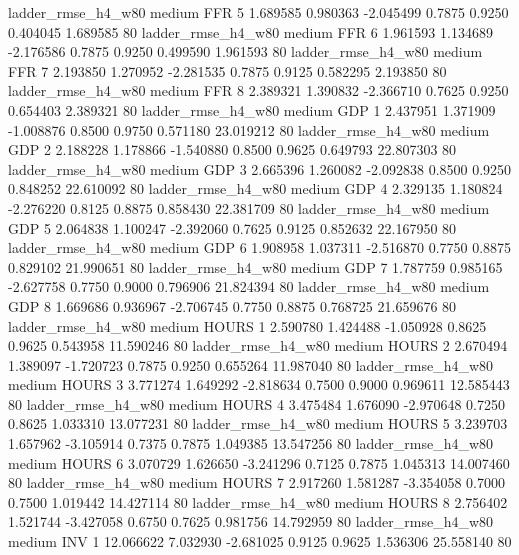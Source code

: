     ladder_rmse_h4_w80     medium      FFR                 5  1.689585 0.980363 -2.045499 0.7875 0.9250  0.404045    1.689585 80
    ladder_rmse_h4_w80     medium      FFR                 6  1.961593 1.134689 -2.176586 0.7875 0.9250  0.499590    1.961593 80
    ladder_rmse_h4_w80     medium      FFR                 7  2.193850 1.270952 -2.281535 0.7875 0.9125  0.582295    2.193850 80
    ladder_rmse_h4_w80     medium      FFR                 8  2.389321 1.390832 -2.366710 0.7625 0.9250  0.654403    2.389321 80
    ladder_rmse_h4_w80     medium      GDP                 1  2.437951 1.371909 -1.008876 0.8500 0.9750  0.571180   23.019212 80
    ladder_rmse_h4_w80     medium      GDP                 2  2.188228 1.178866 -1.540880 0.8500 0.9625  0.649793   22.807303 80
    ladder_rmse_h4_w80     medium      GDP                 3  2.665396 1.260082 -2.092838 0.8500 0.9250  0.848252   22.610092 80
    ladder_rmse_h4_w80     medium      GDP                 4  2.329135 1.180824 -2.276220 0.8125 0.8875  0.858430   22.381709 80
    ladder_rmse_h4_w80     medium      GDP                 5  2.064838 1.100247 -2.392060 0.7625 0.9125  0.852632   22.167950 80
    ladder_rmse_h4_w80     medium      GDP                 6  1.908958 1.037311 -2.516870 0.7750 0.8875  0.829102   21.990651 80
    ladder_rmse_h4_w80     medium      GDP                 7  1.787759 0.985165 -2.627758 0.7750 0.9000  0.796906   21.824394 80
    ladder_rmse_h4_w80     medium      GDP                 8  1.669686 0.936967 -2.706745 0.7750 0.8875  0.768725   21.659676 80
    ladder_rmse_h4_w80     medium    HOURS                 1  2.590780 1.424488 -1.050928 0.8625 0.9625  0.543958   11.590246 80
    ladder_rmse_h4_w80     medium    HOURS                 2  2.670494 1.389097 -1.720723 0.7875 0.9250  0.655264   11.987040 80
    ladder_rmse_h4_w80     medium    HOURS                 3  3.771274 1.649292 -2.818634 0.7500 0.9000  0.969611   12.585443 80
    ladder_rmse_h4_w80     medium    HOURS                 4  3.475484 1.676090 -2.970648 0.7250 0.8625  1.033310   13.077231 80
    ladder_rmse_h4_w80     medium    HOURS                 5  3.239703 1.657962 -3.105914 0.7375 0.7875  1.049385   13.547256 80
    ladder_rmse_h4_w80     medium    HOURS                 6  3.070729 1.626650 -3.241296 0.7125 0.7875  1.045313   14.007460 80
    ladder_rmse_h4_w80     medium    HOURS                 7  2.917260 1.581287 -3.354058 0.7000 0.7500  1.019442   14.427114 80
    ladder_rmse_h4_w80     medium    HOURS                 8  2.756402 1.521744 -3.427058 0.6750 0.7625  0.981756   14.792959 80
    ladder_rmse_h4_w80     medium      INV                 1 12.066622 7.032930 -2.681025 0.9125 0.9625  1.536306   25.558140 80
